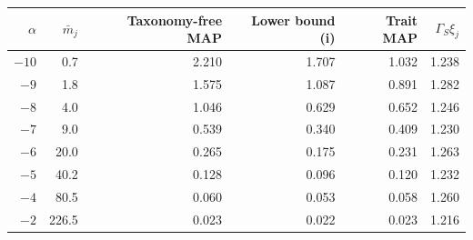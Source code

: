 \begin{tabular}{rrrrrr}
\toprule
$\alpha$ & $\bar m_j$ & Taxonomy-free MAP & Lower bound (i) & Trait MAP & $\Gamma_S\xi_j$\\
\midrule
$-10$ & 0.7 & 2.210 & 1.707 & 1.032 & 1.238\\
$-9$ & 1.8 & 1.575 & 1.087 & 0.891 & 1.282\\
$-8$ & 4.0 & 1.046 & 0.629 & 0.652 & 1.246\\
$-7$ & 9.0 & 0.539 & 0.340 & 0.409 & 1.230\\
$-6$ & 20.0 & 0.265 & 0.175 & 0.231 & 1.263\\
$-5$ & 40.2 & 0.128 & 0.096 & 0.120 & 1.232\\
$-4$ & 80.5 & 0.060 & 0.053 & 0.058 & 1.260\\
$-2$ & 226.5 & 0.023 & 0.022 & 0.023 & 1.216\\
\bottomrule
\end{tabular}
